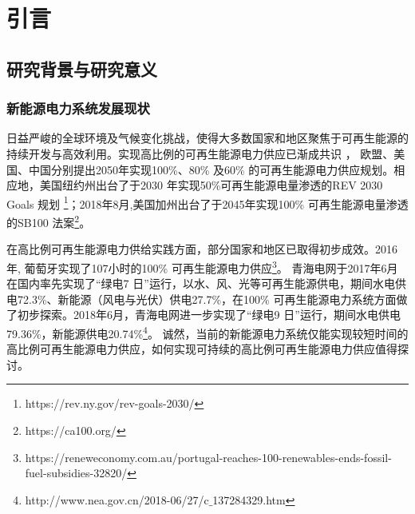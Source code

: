  \chapter{引言}
\label{cha:intro}

\section{研究背景与研究意义}
\label{sec:background}
\subsection{新能源电力系统发展现状}
日益严峻的全球环境及气候变化挑战，使得大多数国家和地区聚焦于可再生能源的持续开发与高效利用。实现高比例的可再生能源电力供应已渐成共识
\cite{Obama-Science-17,Balance-Nature16,Chu-Nature-12}， 欧盟、美国、中国分别提出2050年实现100\%、80\% 及60\% 的可再生能源电力供应规划\cite{PS-Flexibility-Plan-LZX-16}。相应地，美国纽约州出台了于2030 年实现50\%可再生能源电量渗透的REV 2030 Goals 规划
\footnote{https://rev.ny.gov/rev-goals-2030/}；2018年8月,美国加州出台了于2045年实现100\% 可再生能源电量渗透的SB100 法案\footnote{https://ca100.org/}。

在高比例可再生能源电力供给实践方面，部分国家和地区已取得初步成效。2016年, 葡萄牙实现了107小时的100\% 可再生能源电力供应\footnote{https://reneweconomy.com.au/portugal-reaches-100-renewables-ends-fossil-fuel-subsidies-32820/}。 青海电网于2017年6月在国内率先实现了“绿电7 日”运行，以水、风、光等可再生能源供电，期间水电供电72.3\%、新能源（风电与光伏）供电27.7\%，在100\% 可再生能源电力系统方面做了初步探索。2018年6月，青海电网进一步实现了“绿电9 日”运行，期间水电供电79.36\%，新能源供电20.74\%\footnote{http://www.nea.gov.cn/2018-06/27/c$\_$137284329.htm}。 诚然，当前的新能源电力系统仅能实现较短时间的高比例可再生能源电力供应，如何实现可持续的高比例可再生能源电力供应值得探讨。

